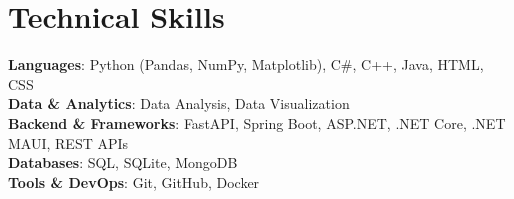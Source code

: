 \section{Technical Skills}
 \begin{itemize}[leftmargin=0.15in, label={}]
    \small{\item{
      \textbf{Languages}{: Python (Pandas, NumPy, Matplotlib), C\#, C++, Java, HTML, CSS} \\
      \textbf{Data \& Analytics}{: Data Analysis, Data Visualization} \\
      \textbf{Backend \& Frameworks}{: FastAPI, Spring Boot, ASP.NET, .NET Core, .NET MAUI, REST APIs} \\
      \textbf{Databases}{: SQL, SQLite, MongoDB} \\
      \textbf{Tools \& DevOps}{: Git, GitHub, Docker}
    }}
 \end{itemize}
